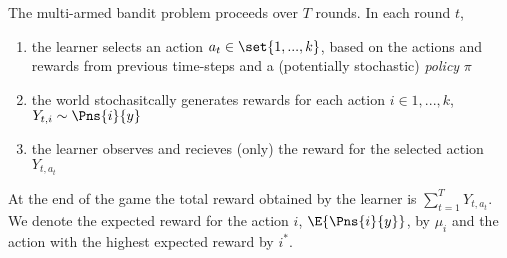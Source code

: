 \vspace{0.5cm}
\begin{definition}
\end{definition}

\vspace{0.5cm}
\begin{definition}
The multi-armed bandit problem proceeds over $T$ rounds. In each round $t$, 
\begin{enumerate}
\item the learner selects an action $a_{t} \in \set{1,...,k}$, based on the actions and rewards from previous time-steps and a (potentially stochastic) \emph{policy} $\pi$
\item the world stochasitcally generates rewards for each action $i \in {1,...,k}$, $Y_{t,i} \sim \Pns{i}{y}$
\item the learner observes and recieves (only) the reward for the selected action $Y_{t,a_t}$ 
\end{enumerate}
At the end of the game the total reward obtained by the learner is $\sum_{t=1}^T Y_{t,a_t}$. We denote the expected reward for the action $i$, $\E{ \Pns{i}{y}}$, by $\mu_i$ and the action with the highest expected reward by $i^*$. 
\end{definition} 

